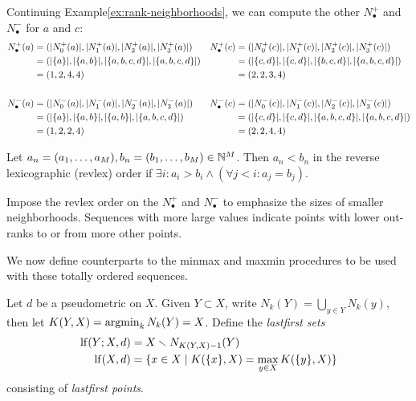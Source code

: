 \documentclass[
]{article}
\begin{document}
\begin{example}\label{ex:rank-sequence}
Continuing Example\nbs\ref{ex:rank-neighborhoods}, we can compute the other $N_\bullet^+$ and $N_\bullet^-$ for $a$ and $c$:
\begin{align*}
    N_\bullet^+ (a) &= (\lvert N^+_0(a)\rvert, \lvert N^+_1(a)\rvert, \lvert N^+_2(a)\rvert, \lvert N^+_3(a)\rvert) &
    N_\bullet^+ (c) &= (\lvert N^+_0(c)\rvert, \lvert N^+_1(c)\rvert, \lvert N^+_2(c)\rvert, \lvert N^+_3(c)\rvert) \\
    &= (\lvert \{a\}\rvert, \lvert \{a, b\}\rvert, \lvert \{a, b, c, d\}\rvert, \lvert \{a, b, c, d\}\rvert) &
    &= (\lvert \{c, d\}\rvert, \lvert \{c, d\}\rvert, \lvert \{b, c, d\}\rvert, \lvert \{a, b, c, d\}\rvert) \\
    &= (1, 2, 4, 4) &
    &= (2, 2, 3, 4) \\
    \\
    N_\bullet^- (a) &= (\lvert N^-_0(a)\rvert, \lvert N^-_1(a)\rvert, \lvert N^-_2(a)\rvert, \lvert N^-_3(a)\rvert) &
    N_\bullet^- (c) &= (\lvert N^-_0(c)\rvert, \lvert N^-_1(c)\rvert, \lvert N^-_2(c)\rvert, \lvert N^-_3(c)\rvert) \\
    &= (\lvert \{a\}\rvert, \lvert \{a, b\}\rvert, \lvert \{a, b\}\rvert, \lvert \{a, b, c, d\}\rvert) &
    &= (\lvert \{c, d\}\rvert, \lvert \{c, d\}\rvert, \lvert \{a, b, c, d\}\rvert, \lvert \{a, b, c, d\}\rvert) \\
    &= (1, 2, 2, 4) &
    &= (2, 2, 4, 4)
\end{align*}
\end{example}

\begin{definition}
    Let $a_n = (a_1,\ldots,a_M),b_n = (b_1,\ldots,b_M)\in\mathbb{N}^M$.
    Then $a_n < b_n$ in the reverse lexicographic (revlex) order if $\exists i : a_i > b_i \wedge (\forall j<i : a_j = b_j)$.
\end{definition}

Impose the revlex order on the \(N_\bullet^+\) and \(N_\bullet^-\) to
emphasize the sizes of smaller neighborhoods. Sequences with more large
values indicate points with lower out-ranks to or from more other
points.

We now define counterparts to the minmax and maxmin procedures to be
used with these totally ordered sequences.

\begin{definition}
    Let $d$ be a pseudometric on $X$.
    Given $Y\subset X$, write $N_k(Y) = \bigcup_{y \in Y}{N_k(y)}$, then let $K(Y,X) = \operatorname{argmin}_{k}{N_k(Y) = X}$.
    Define the \emph{lastfirst sets}
    \begin{align*}
        \operatorname{lf}(Y;X,d) &= X \smallsetminus N_{K(Y,X) - 1}(Y) \\
        \operatorname{lf}(X,d)   &= \{ x \in X \mid K(\{x\},X) = \max_{y \in X}{K(\{y\},X)} \}
    \end{align*}
    consisting of \emph{lastfirst points}.
\end{definition}
\end{document}
